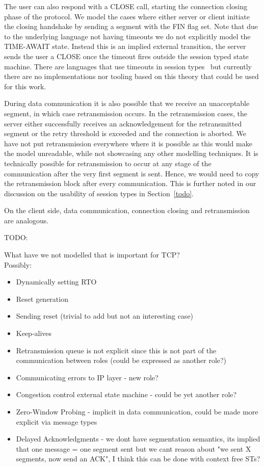 \documentclass{article}
\newcommand{\todo}[1]{}
\renewcommand{\todo}[1]{{\color{red} TODO: {#1}}}
\begin{document}
The user can also respond with a CLOSE call, starting the connection closing phase of the protocol.
We model the cases where either server or client initiate the closing handshake by sending a segment with the FIN flag set.
Note that due to the underlying language not having timeouts we do not explicitly model the TIME-AWAIT state.
Instead this is an implied external transition, the server sends the user a CLOSE once the timeout fires outside the session typed state machine.
There are languages that use timeouts in session types~\cite{todo} but currently there are no implementations nor tooling based on this theory that could be used for this work.

During data communication it is also possible that we receive an unacceptable segment, in which case retransmission occurs.
In the retransmission cases, the server either successfully receives an acknowledgement for the retransmitted segment or the retry threshold is exceeded and the connection is aborted.
We have not put retransmission everywhere where it is possible as this would make the model unreadable, while not showcasing any other modelling techniques.
It is technically possible for retransmission to occur at any stage of the communication after the very first segment is sent.
Hence, we would need to copy the retransmission block after every communication.
This is further noted in our discussion on the usability of session types in Section~\ref{todo}.

On the client side, data communication, connection closing and retransmission are analogous.

\todo{What have we not modelled that is important for TCP? \\
Possibly:\\
\begin{itemize}
    \item Dynamically setting RTO
    \item Reset generation
    \item Sending reset (trivial to add but not an interesting case)
    \item Keep-alives
    \item Retransmission queue is not explicit since this is not part of the communication between roles (could be expressed as another role?)
    \item Communicating errors to IP layer - new role?
    \item Congestion control external state machine - could be yet another role?
    \item Zero-Window Probing - implicit in data communication, could be made more explicit via message types
    \item Delayed Acknowledgments - we dont have segmentation semantics, its implied that one message = one segment sent but we cant reason about "we sent X segments, now send an ACK", I think this can be done with context free STs?
\end{itemize}
}
\end{document}
